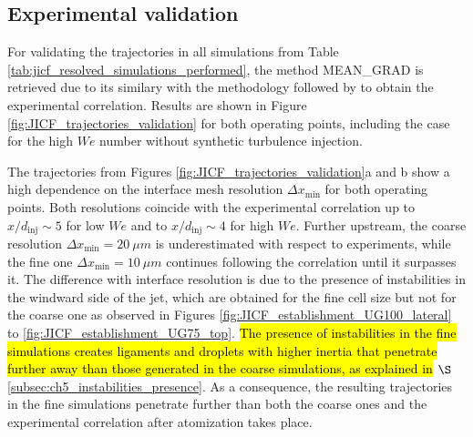 \subsection{Experimental validation}

For validating the trajectories in all simulations from Table \ref{tab:jicf_resolved_simulations_performed}, the method MEAN\_GRAD is retrieved due to its similary with the methodology followed by  to obtain the experimental correlation. Results are shown in Figure \ref{fig:JICF_trajectories_validation} for both operating points, including the case for the high $We$ number without synthetic turbulence injection.

The trajectories from Figures \ref{fig:JICF_trajectories_validation}a and b show a high dependence on the interface mesh resolution $\Delta x_\mathrm{min}$ for both operating points. Both resolutions coincide with the experimental correlation up to $x/d_\mathrm{inj} \sim 5$ for low $We$ and to $x/d_\mathrm{inj} \sim 4$ for high $We$. Further upstream, the coarse resolution $\Delta x_\mathrm{min} = 20~\mu m$ is underestimated with respect to experiments, while the fine one $\Delta x_\mathrm{min} = 10~\mu m$ continues following the correlation until it surpasses it. The difference with interface resolution is due to the presence of instabilities in the windward side of the jet, which are obtained for the fine cell size but not for the coarse one as observed in Figures \ref{fig:JICF_establishment_UG100_lateral} to \ref{fig:JICF_establishment_UG75_top}. \hl{The presence of instabilities in the fine simulations creates ligaments and droplets with higher inertia that penetrate further away than those generated in the coarse simulations, as explained in }$\S$\ref{subsec:ch5_instabilities_presence}. As a consequence, the resulting trajectories in the fine simulations penetrate further than both the coarse ones and the experimental correlation after atomization takes place. 

